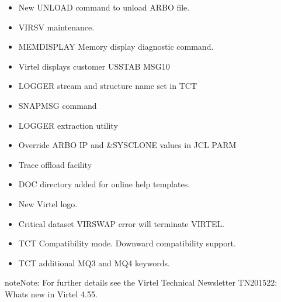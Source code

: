 \documentclass[letterpaper,10pt,english]{sphinxmanual}
\begin{document}
\sphinxAtStartPar
{}
\begin{itemize}
\item {} 
\sphinxAtStartPar
New UNLOAD command to unload ARBO file.

\item {} 
\sphinxAtStartPar
VIRSV maintenance.

\item {} 
\sphinxAtStartPar
MEMDISPLAY \sphinxhyphen{} Memory display diagnostic command.

\item {} 
\sphinxAtStartPar
Virtel displays customer USSTAB MSG10

\item {} 
\sphinxAtStartPar
LOGGER stream and structure name set in TCT

\item {} 
\sphinxAtStartPar
SNAPMSG command

\item {} 
\sphinxAtStartPar
LOGGER extraction utility

\item {} 
\sphinxAtStartPar
Override ARBO IP and \&SYSCLONE values in JCL PARM

\item {} 
\sphinxAtStartPar
Trace offload facility

\item {} 
\sphinxAtStartPar
DOC directory added for online help templates.

\item {} 
\sphinxAtStartPar
New Virtel logo.

\item {} 
\sphinxAtStartPar
Critical dataset VIRSWAP error will terminate VIRTEL.

\item {} 
\sphinxAtStartPar
TCT Compatibility mode. Downward compatibility support.

\end{itemize}

\sphinxAtStartPar
{}
\begin{itemize}
\item {} 
\sphinxAtStartPar
TCT additional MQ3 and MQ4 keywords.

\end{itemize}

\begin{sphinxadmonition}{note}{Note:}
\sphinxAtStartPar
For further details see the Virtel Technical Newsletter TN201522: Whats new in Virtel 4.55.
\end{sphinxadmonition}
\end{document}
